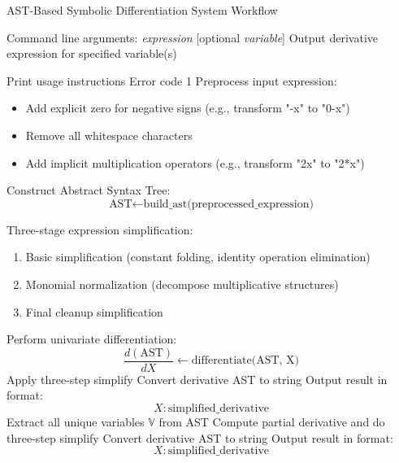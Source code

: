 \documentclass{report}
\begin{document}
\begin{algorithm}[H]
\caption{AST-Based Symbolic Differentiation System Workflow}
\begin{algorithmic}[]
\Require Command line arguments: \textit{expression} [optional \textit{variable}]
\Ensure Output derivative expression for specified variable(s)

    \State Print usage instructions
    \State \Return Error code 1
\Else
    \State Preprocess input expression:
    \begin{itemize}
        \item Add explicit zero for negative signs (e.g., transform "-x" to "0-x")
        \item Remove all whitespace characters
        \item Add implicit multiplication operators (e.g., transform "2x" to "2*x")
    \end{itemize}
    
    \State Construct Abstract Syntax Tree:
    \begin{equation*}
        \text{AST} \gets \text{build\_ast(preprocessed\_expression)}
    \end{equation*}
    
    \State Three-stage expression simplification:
    \begin{enumerate}
        \item Basic simplification (constant folding, identity operation elimination)
        \item Monomial normalization (decompose multiplicative structures)
        \item Final cleanup simplification
    \end{enumerate}
    
        \State Perform univariate differentiation:
        \begin{equation*}
            \frac{d(\text{AST})}{dX} \gets \text{differentiate(AST, X)}
        \end{equation*}
        \State Apply three-step simplify
        \State Convert derivative AST to string
        \State Output result in format:
        \begin{equation*}
            X: \text{simplified\_derivative}
        \end{equation*}
    \Else
        \State Extract all unique variables $\mathbb{V}$ from AST
            \State Compute partial derivative and do three-step simplify
            \State Convert derivative AST to string
            \State Output result in format:
            \begin{equation*}
                X: \text{simplified\_derivative}
            \end{equation*}
        \EndFor
    \EndIf
\EndIf
\end{algorithmic}
\end{algorithm}
\end{document}

